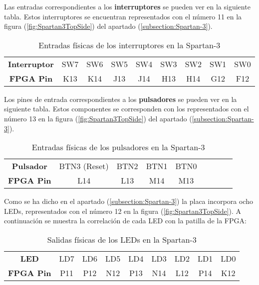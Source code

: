 Las entradas correspondientes a los \textbf{interruptores} se pueden ver en la siguiente tabla. Estos interruptores se encuentran representados con el número 11 en la figura (\ref{fig:Spartan3TopSide}) del apartado (\ref{subsection:Spartan-3}).

\begin{table}[H]
        \centering
		\begin{tabular}{|c|c|c|c|c|c|c|c|c|}
			\hline
			\rowcolor[rgb]{0.21,0.69,0.87}\multicolumn{9}{|c|}{  \textbf{ {Entradas Interruptores}}} \\
			\hline \hline
			\textbf{  Interruptor  } & SW7 & SW6 & SW5 & SW4 & SW3 & SW2 & SW1 & SW0 \\
			\hline
			\textbf{  FPGA Pin  } & K13 & K14 & J13 & J14 & H13 & H14 & G12 & F12 \\
			\hline
			 
		\end{tabular}
	\caption{ Entradas físicas de los interruptores en la Spartan-3 }
	\label{tab:tablaEntradasInterruptores}
\end{table}

Los pines de entrada correspondientes a los \textbf{pulsadores} se pueden ver en la siguiente tabla. Estos componentes se corresponden con los representados con el número 13 en la figura (\ref{fig:Spartan3TopSide}) del apartado (\ref{subsection:Spartan-3}).

\begin{table}[H]
        \centering
		\begin{tabular}{|c|c|c|c|c|c|c|c|c|}
			\hline
			\rowcolor[rgb]{0.21,0.69,0.87}\multicolumn{9}{|c|}{  \textbf{ {Entradas Pulsadores}}} \\
			\hline \hline
			\textbf{  Pulsador  } & BTN3 (Reset) & BTN2 & BTN1 & BTN0  \\
			\hline
			\textbf{  FPGA Pin  } & L14 & L13 & M14 & M13  \\
			\hline
			 
		\end{tabular}
	\caption{ Entradas físicas de los pulsadores en la Spartan-3 }
	\label{tab:tablaEntradasPulsadores}
\end{table}

Como se ha dicho en el apartado (\ref{subsection:Spartan-3}) la placa incorpora ocho LEDs, representados con el número 12 en la figura (\ref{fig:Spartan3TopSide}). A continuación se muestra la correlación de cada LED con la patilla de la FPGA:

\begin{table}[H]
        \centering
		\begin{tabular}{|c|c|c|c|c|c|c|c|c|}
			\hline
			\rowcolor[rgb]{0.21,0.69,0.87}\multicolumn{9}{|c|}{  \textbf{ {Salidas LED}}} \\
			\hline \hline
			\textbf{  LED  } & LD7 & LD6 & LD5 & LD4 & LD3 & LD2 & LD1 & LD0 \\
			\hline
			\textbf{  FPGA Pin  } & P11 & P12 & N12 & P13 & N14 & L12 & P14 & K12  \\
			\hline
			 
		\end{tabular}
	\caption{ Salidas físicas de los LEDs en la Spartan-3 }
	\label{tab:tablaSalidasLED}
\end{table}